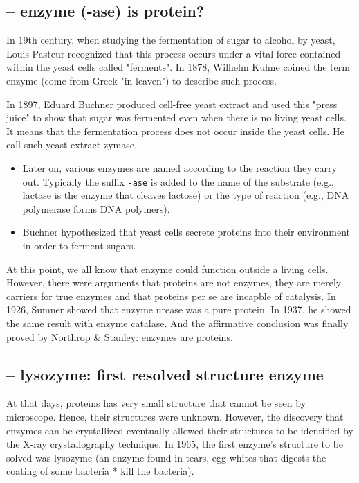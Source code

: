 \subsection{-- enzyme (-ase) is protein?}
\label{sec:enzyme-history}

In 19th century, when studying the fermentation of sugar to alcohol by
yeast, Louis Pasteur recognized that this process occurs under a vital
force contained within the yeast cells called "ferments". In 1878,
Wilhelm Kuhne coined the term enzyme (come from Greek "in leaven") to
describe such process.

In 1897, Eduard Buchner produced cell-free yeast extract and used this
"press juice" to show that sugar was fermented even when there is no
living yeast cells. It means that the fermentation process does not
occur inside the yeast cells. He call such yeast extract zymase.
\begin{itemize}
 \item Later on, various enzymes are named according to the reaction
   they carry out. Typically the suffix \verb!-ase! is added to the
   name of the substrate (e.g., lactase is the enzyme that cleaves
   lactose) or the type of reaction (e.g., DNA polymerase forms DNA
   polymers).

  \item Buchner hypothesized that yeast cells secrete proteins into
    their environment in order to ferment sugars.
\end{itemize}

At this point, we all know that enzyme could function outside a living
cells. However, there were arguments that proteins are not enzymes,
they are merely carriers for true enzymes and that proteins per se are
incapble of catalysis. In 1926, Sumner showed that enzyme urease was a
pure protein. In 1937, he showed the same result with enzyme
catalase. And the affirmative conclusion was finally proved by
Northrop \& Stanley: enzymes are proteins.

\subsection{-- lysozyme: first resolved structure enzyme}
\label{sec:lysozyme-history}

At that days, proteins has very small structure that cannot be seen by
microscope. Hence, their structures were unknown. However, the
discovery that enzymes can be crystallized eventually allowed their
structures to be identified by the X-ray crystallography technique. In
1965, the first enzyme's structure to be solved was lysozyme (an
enzyme found in tears, egg whites that digests the coating of some
bacteria * kill the bacteria).

